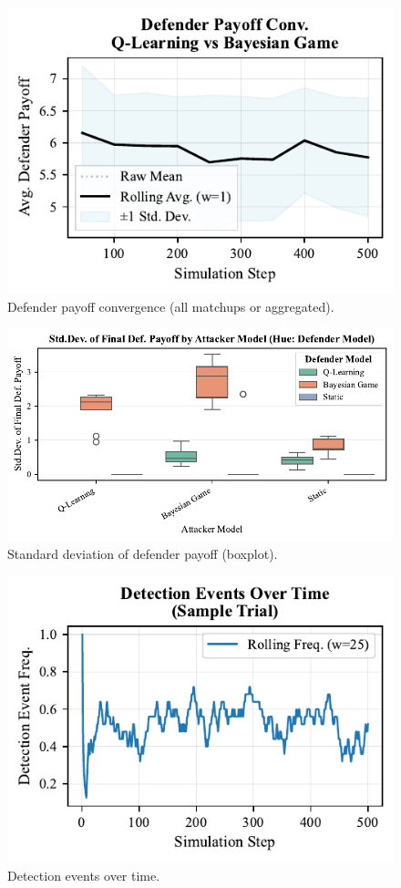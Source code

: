 \documentclass[conference]{IEEEtran}
\begin{document}
\begin{figure}[h!]
    \centering
    \includegraphics[width=0.9\linewidth]{figures/appendix/fig_def_convergence.pdf}
    \caption{Defender payoff convergence (all matchups or aggregated).}
\end{figure}

\begin{figure}[h!]
    \centering
    \includegraphics[width=0.9\linewidth]{figures/appendix/fig_def_payoff_stdev_boxplot.pdf}
    \caption{Standard deviation of defender payoff (boxplot).}
\end{figure}

\begin{figure}[h!]
    \centering
    \includegraphics[width=0.9\linewidth]{figures/appendix/fig_detection_events_over_time.pdf}
    \caption{Detection events over time.}
\end{figure}
\end{document}
